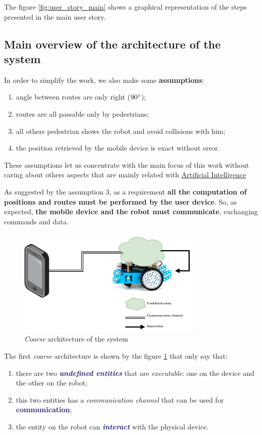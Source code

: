 The figure \ref{fig:user_story_main} shows a graphical representation of the steps presented in the main user story.

\subsection{Main overview of the architecture of the system}

In order to simplify the work, we also make some \textbf{assumptions}:
\begin{enumerate}
	\item angle between routes are only right ($90\degree$);
	\item routes are all passable only by pedestrians;
	\item all others pedestrian shows the robot and avoid collisions with him;
	\item the position retrieved by the mobile device is exact without error.
\end{enumerate}

These assumptions let us concentrate with the main focus of this work without caring about others aspects that are mainly related with \href{https://en.wikipedia.org/wiki/Artificial_intelligence}{Artificial Intelligence}

As suggested by the assumption $3$, as a requirement \textbf{all the computation of positions and routes must be performed by the user device}. So, as expected, \textbf{the mobile device and the robot must communicate}, exchanging commands and data.

\begin{figure}[h!]
	\centering
	\includegraphics[width=0.8\textwidth]{img/coarse_architecture.pdf}
	\caption{\textit{Coarse} architecture of the system}
	\label{fig:coarse_architecture}
\end{figure}

The first \textit{coarse} architecture is shown by the figure \ref{fig:coarse_architecture} that only say that:
\begin{enumerate}
	\item there are two \textcolor{MidnightBlue}{\textbf{\textit{undefined entities}}} that are \textit{executable}: one on the device and the other on the robot;
	\item this two entities has a \textit{communication channel} that can be used for \textcolor{MidnightBlue}{\textbf{communication}};
	\item the entity on the robot can \textcolor{MidnightBlue}{\textbf{\textit{interact}}} with the physical device.
\end{enumerate}

